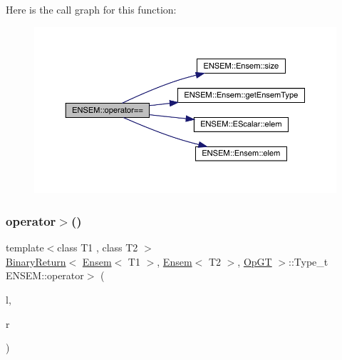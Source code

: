 Here is the call graph for this function\+:\nopagebreak
\begin{figure}[H]
\begin{center}
\leavevmode
\includegraphics[width=350pt]{d1/d9e/group__eensem_gade522cbdb1f590216dd1c5e3dd034e79_cgraph}
\end{center}
\end{figure}
\mbox{\label{group__eensem_ga27f81ac9863b6ebd1af9a0927fd2c356}} 
\subsubsection{\texorpdfstring{operator$>$()}{operator>()}\hspace{0.1cm}{\footnotesize\ttfamily [1/3]}}
{\footnotesize\ttfamily template$<$class T1 , class T2 $>$ \\
\mbox{\hyperlink{structENSEM_1_1BinaryReturn}{Binary\+Return}}$<$ \mbox{\hyperlink{classENSEM_1_1Ensem}{Ensem}}$<$ T1 $>$, \mbox{\hyperlink{classENSEM_1_1Ensem}{Ensem}}$<$ T2 $>$, \mbox{\hyperlink{structENSEM_1_1OpGT}{Op\+GT}} $>$\+::Type\+\_\+t E\+N\+S\+E\+M\+::operator$>$ (\begin{DoxyParamCaption}\item[{const \mbox{\hyperlink{classENSEM_1_1Ensem}{Ensem}}$<$ T1 $>$ \&}]{l,  }\item[{const \mbox{\hyperlink{classENSEM_1_1Ensem}{Ensem}}$<$ T2 $>$ \&}]{r }\end{DoxyParamCaption})\hspace{0.3cm}{\ttfamily [inline]}}

